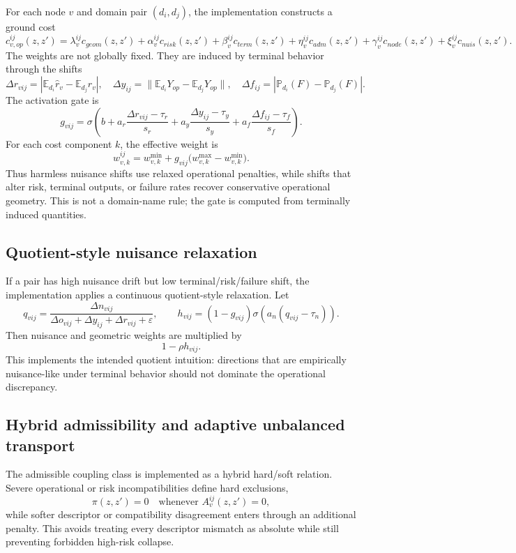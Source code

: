 \documentclass[11pt,a4paper]{article}
\begin{document}
For each node \(v\) and domain pair \((d_i,d_j)\), the implementation constructs a ground cost
\[
c^{ij}_{v,op}(z,z')=
\lambda^{ij}_v c_{geom}(z,z')+
\alpha^{ij}_v c_{risk}(z,z')+
\beta^{ij}_v c_{term}(z,z')+
\eta^{ij}_v c_{adm}(z,z')+
\gamma^{ij}_v c_{node}(z,z')+
\xi^{ij}_v c_{nuis}(z,z').
\]
The weights are not globally fixed. They are induced by terminal behavior through the shifts
\[
\Delta r_{vij}=|\mathbb E_{d_i}\hat r_v-\mathbb E_{d_j}\hat r_v|,
\quad
\Delta y_{ij}=\|\mathbb E_{d_i}Y_{op}-\mathbb E_{d_j}Y_{op}\|,
\quad
\Delta f_{ij}=|\mathbb P_{d_i}(F)-\mathbb P_{d_j}(F)|.
\]
The activation gate is
\[
g_{vij}=\sigma\left(
 b+
 a_r\frac{\Delta r_{vij}-\tau_r}{s_r}+
 a_y\frac{\Delta y_{ij}-\tau_y}{s_y}+
 a_f\frac{\Delta f_{ij}-\tau_f}{s_f}
\right).
\]
For each cost component \(k\), the effective weight is
\[
w^{ij}_{v,k}=w^{\min}_{v,k}+g_{vij}\bigl(w^{\max}_{v,k}-w^{\min}_{v,k}\bigr).
\]
Thus harmless nuisance shifts use relaxed operational penalties, while shifts that alter risk, terminal outputs, or failure rates recover conservative operational geometry. This is not a domain-name rule; the gate is computed from terminally induced quantities.

\subsection*{Quotient-style nuisance relaxation}

If a pair has high nuisance drift but low terminal/risk/failure shift, the implementation applies a continuous quotient-style relaxation. Let
\[
q_{vij}=\frac{\Delta n_{vij}}{\Delta o_{vij}+\Delta y_{ij}+\Delta r_{vij}+\varepsilon},
\qquad
h_{vij}=(1-g_{vij})\sigma(a_n(q_{vij}-\tau_n)).
\]
Then nuisance and geometric weights are multiplied by
\[
1-\rho h_{vij}.
\]
This implements the intended quotient intuition: directions that are empirically nuisance-like under terminal behavior should not dominate the operational discrepancy.

\subsection*{Hybrid admissibility and adaptive unbalanced transport}

The admissible coupling class is implemented as a hybrid hard/soft relation. Severe operational or risk incompatibilities define hard exclusions,
\[
\pi(z,z')=0\quad\text{whenever }A^{ij}_v(z,z')=0,
\]
while softer descriptor or compatibility disagreement enters through an additional penalty. This avoids treating every descriptor mismatch as absolute while still preventing forbidden high-risk collapse.
\end{document}
